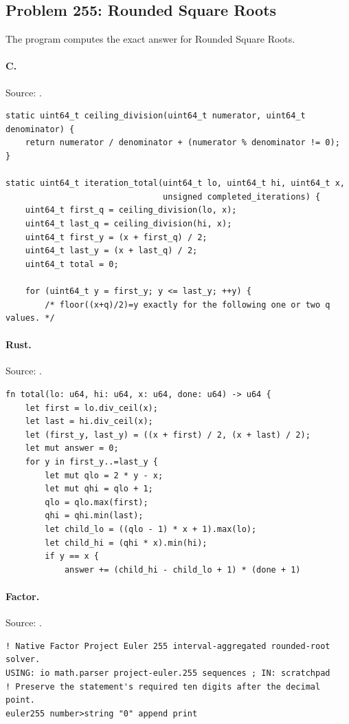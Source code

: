 \subsection{Problem 255: Rounded Square Roots}
\label{walkthrough:p255}
The program computes the exact answer for Rounded Square Roots.

\paragraph{C.} Source: .
\begin{lstlisting}
static uint64_t ceiling_division(uint64_t numerator, uint64_t denominator) {
    return numerator / denominator + (numerator % denominator != 0);
}

static uint64_t iteration_total(uint64_t lo, uint64_t hi, uint64_t x,
                                unsigned completed_iterations) {
    uint64_t first_q = ceiling_division(lo, x);
    uint64_t last_q = ceiling_division(hi, x);
    uint64_t first_y = (x + first_q) / 2;
    uint64_t last_y = (x + last_q) / 2;
    uint64_t total = 0;

    for (uint64_t y = first_y; y <= last_y; ++y) {
        /* floor((x+q)/2)=y exactly for the following one or two q values. */
\end{lstlisting}

\paragraph{Rust.} Source: .
\begin{lstlisting}
fn total(lo: u64, hi: u64, x: u64, done: u64) -> u64 {
    let first = lo.div_ceil(x);
    let last = hi.div_ceil(x);
    let (first_y, last_y) = ((x + first) / 2, (x + last) / 2);
    let mut answer = 0;
    for y in first_y..=last_y {
        let mut qlo = 2 * y - x;
        let mut qhi = qlo + 1;
        qlo = qlo.max(first);
        qhi = qhi.min(last);
        let child_lo = ((qlo - 1) * x + 1).max(lo);
        let child_hi = (qhi * x).min(hi);
        if y == x {
            answer += (child_hi - child_lo + 1) * (done + 1)
\end{lstlisting}

\paragraph{Factor.} Source: .
\begin{lstlisting}
! Native Factor Project Euler 255 interval-aggregated rounded-root solver.
USING: io math.parser project-euler.255 sequences ; IN: scratchpad
! Preserve the statement's required ten digits after the decimal point.
euler255 number>string "0" append print
\end{lstlisting}

